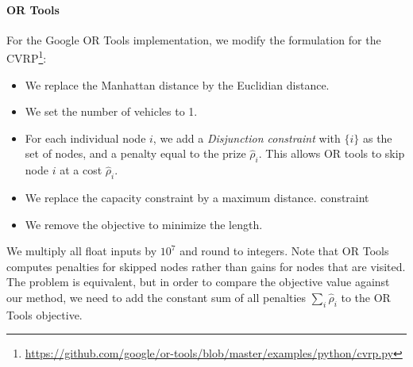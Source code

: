 \paragraph{OR Tools}
For the Google OR Tools implementation, we modify the formulation for the CVRP\footnote{\url{https://github.com/google/or-tools/blob/master/examples/python/cvrp.py}}:
\begin{itemize}
    \item We replace the Manhattan distance by the Euclidian distance.
    \item We set the number of vehicles to 1.
    \item For each individual node $i$, we add a \emph{Disjunction constraint} with $\{i\}$ as the set of nodes, and a penalty equal to the prize $\hat{\rho}_i$. This allows OR tools to skip node $i$ at a cost $\hat{\rho}_i$.
    \item We replace the capacity constraint by a maximum distance. constraint
    \item We remove the objective to minimize the length.
\end{itemize}
We multiply all float inputs by $10^7$ and round to integers. Note that OR Tools computes penalties for skipped nodes rather than gains for nodes that are visited. The problem is equivalent, but in order to compare the objective value against our method, we need to add the constant sum of all penalties $\sum_i \hat{\rho}_i$ to the OR Tools objective.

